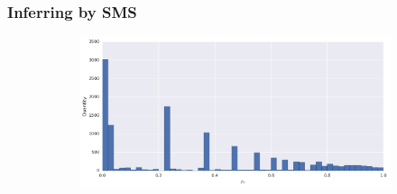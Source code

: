 \subsubsection{Inferring by SMS}

\begin{figure}[h]
\centering
\begin{subfigure}[t]{\textwidth}
	\includegraphics[width=\textwidth]{figures/bayes/hist_sms.png}
\end{subfigure}


\end{figure}
